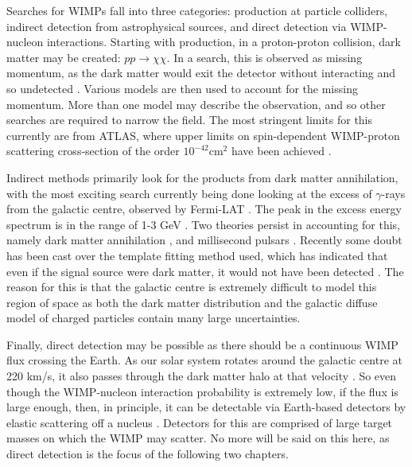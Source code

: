 \par
Searches for WIMPs fall into three categories: production at particle colliders, indirect detection from astrophysical sources, and direct detection via WIMP-nucleon interactions.
Starting with production, in a proton-proton collision, dark matter may be created: $pp\xrightarrow{}\chi\chi$.
In a search, this is observed as missing momentum, as the dark matter would exit the detector without interacting and so undetected \cite{lhc_darkmatter_ref}.
Various models are then used to account for the missing momentum.
More than one model may describe the observation, and so other searches are required to narrow the field.
The most stringent limits for this currently are from ATLAS, where upper limits on spin-dependent WIMP-proton scattering cross-section of the order $10^{-42}$cm$^{2}$ have been achieved \cite{atlas_wimp_ref}.
\par
Indirect methods primarily look for the products from dark matter annihilation, with the most exciting search currently being done looking at the excess of $\gamma$-rays from the galactic centre, observed by Fermi-LAT \cite{fermi_lat_excess_ref}.
The peak in the excess energy spectrum is in the range of 1-3 GeV \cite{galactic_excess_peak_ref}.
Two theories persist in accounting for this, namely dark matter annihilation \cite{galactic_gamma_excess_1_ref, galactic_gamma_excess_2_ref}, and millisecond pulsars \cite{galactic_gamma_excess_3_ref, galactic_gamma_excess_4_ref}.
Recently some doubt has been cast over the template fitting method used, which has indicated that even if the signal source were dark matter, it would not have been detected \cite{galactic_gamma_excess_5_ref}.
The reason for this is that the galactic centre is extremely difficult to model this region of space as both the dark matter distribution and the galactic diffuse model of charged particles contain many large uncertainties.
\par
Finally, direct detection may be possible as there should be a continuous WIMP flux crossing the Earth.
As our solar system rotates around the galactic centre at 220 km/s, it also passes through the dark matter halo at that velocity \cite{wimp_theory_ref}. 
So even though the WIMP-nucleon interaction probability is extremely low, if the flux is large enough, then, in principle, it can be detectable via Earth-based detectors by elastic scattering off a nucleus \cite{wimp_nucleon_interactions_first_suggestion_ref,supersymmetric_dark_matter_ref}.
Detectors for this are comprised of large target masses on which the WIMP may scatter.
No more will be said on this here, as direct detection is the focus of the following two chapters.

